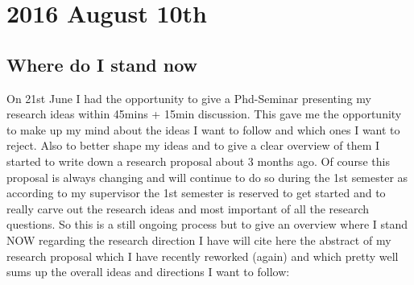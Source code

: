 \section*{2016 August 10th}
\subsection*{Where do I stand now}
On 21st June I had the opportunity to give a Phd-Seminar presenting my research ideas within 45mins + 15min discussion. This gave me the opportunity to make up my mind about the ideas I want to follow and which ones I want to reject. Also to better shape my ideas and to give a clear overview of them I started to write down a research proposal about 3 months ago. Of course this proposal is always changing and will continue to do so during the 1st semester as according to my supervisor the 1st semester is reserved to get started and to really carve out the research ideas and most important of all the research questions. So this is a still ongoing process but to give an overview where I stand NOW regarding the research direction I have will cite here the abstract of my research proposal which I have recently reworked (again) and which pretty well sums up the overall ideas and directions I want to follow:

